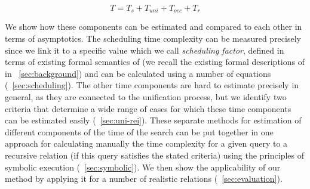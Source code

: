 \[ T = T_s + T_{uni} + T_{occ} + T_r \]

We show how these components can be estimated and compared to each other in terms of asymptotics. The scheduling time complexity can be measured precisely since we link it to a specific value which we
call \emph{scheduling factor}, defined in terms of existing formal semantics of \mK (we recall the existing formal descriptions of \mK in \sectionword~\ref{sec:background}) and can be calculated using
a number of equations (\sectionword~\ref{sec:scheduling}). The other time components are hard to estimate precisely in general, as they are connected to the unification process, but we identify two
criteria that determine a wide range of cases for which these time components can be estimated easily (\sectionword~\ref{sec:uni-rei}). These separate methods for estimation of
different components of the time of the search can be put together in one approach for calculating manually the time complexity for a given query to a recursive relation (if this query satisfies the stated
criteria) using the principles of symbolic execution (\sectionword~\ref{sec:symbolic}). We then show the applicability of our method by applying it for a number of realistic \mK relations (\sectionword~\ref{sec:evaluation}).
